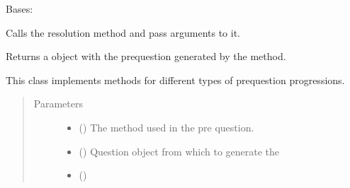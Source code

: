\documentclass[letterpaper,10pt,english]{sphinxmanual}
\begin{document}
\begin{fulllineitems}
\label{\detokenize{index:birdears.prequestion.PreQuestion}}
\sphinxAtStartPar
Bases: 

\begin{fulllineitems}
\label{\detokenize{index:birdears.prequestion.PreQuestion.__call__}}
\sphinxAtStartPar
Calls the resolution method and pass arguments to it.

\sphinxAtStartPar
Returns a  object with the pre\sphinxhyphen{}question generated by
the method.

\end{fulllineitems}


\begin{fulllineitems}
\label{\detokenize{index:birdears.prequestion.PreQuestion.__init__}}
\sphinxAtStartPar
This class implements methods for different types of pre\sphinxhyphen{}question
progressions.
\begin{quote}\begin{description}
\item[{Parameters}] \leavevmode\begin{itemize}
\item {} 
\sphinxAtStartPar
{} () \textendash{} The method used in the pre question.

\item {} 
\sphinxAtStartPar
{} () \textendash{} Question object from which to generate the

\item {} 
\sphinxAtStartPar
{} () \textendash{} 

\end{itemize}

\end{description}\end{quote}

\end{fulllineitems}


\end{fulllineitems}
\end{document}
